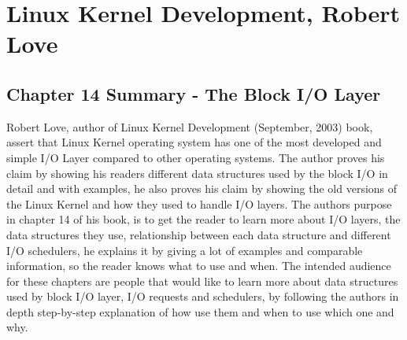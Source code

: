 \documentclass[letterpaper,10pt,draftclsnofoot,onecolumn]{IEEEtran}
\begin{document}


	
\section*{Linux Kernel Development, Robert Love}
\subsection*{Chapter 14 Summary - The Block I/O Layer}

Robert Love, author of Linux Kernel Development (September, 2003) book, assert that Linux Kernel operating system has one of the most developed and simple I/O Layer compared to other operating systems. The author proves his claim by showing his readers different data structures used by the block I/O in detail and with examples, he also proves his claim by showing the old versions of the Linux Kernel and how they used to handle I/O layers. The author\textquotesingle s purpose in chapter 14 of his book, is to get the reader to learn more about I/O layers, the data structures they use, relationship between each data structure and different I/O schedulers, he explains it by giving a lot of examples and comparable information, so the reader knows what to use and when. The intended audience for these chapters are people that would like to learn more about data structures used by block I/O layer, I/O requests and schedulers, by following the author\textquotesingle s in depth step-by-step explanation of how use them and when to use which one and why.
\end{document}
